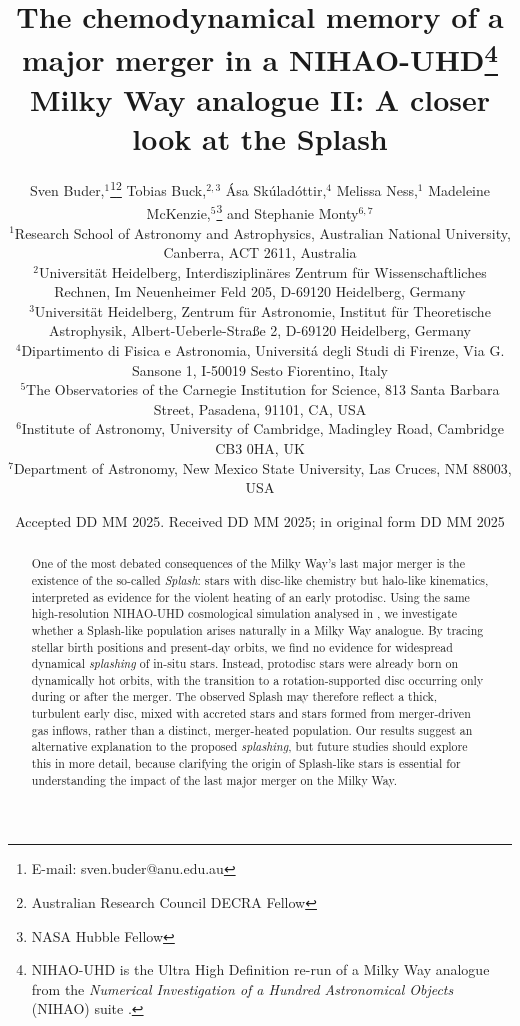 \documentclass[fleqn,usenatbib]{mnras}
\title[A closer look at the Splash]{The chemodynamical memory of a major merger in a NIHAO-UHD\thanks{NIHAO-UHD is the Ultra High Definition re-run of a Milky Way analogue from the \textit{Numerical Investigation of a Hundred Astronomical Objects} (NIHAO) suite \citep{Wang2015}.} Milky Way analogue II: A closer look at the Splash}
\author[S. Buder et al.]{Sven Buder,$^{1}$\thanks{E-mail: sven.buder@anu.edu.au}\thanks{Australian Research Council DECRA Fellow}\orcidlink{0000-0002-4031-8553}
Tobias Buck,$^{2,3}$\orcidlink{0000-0003-2027-399X}
Ása Skúladóttir,$^{4}$\orcidlink{0000-0001-9155-9018}
Melissa Ness,$^{1}$\orcidlink{0000-0001-5082-6693}
Madeleine McKenzie,$^{5}$\thanks{NASA Hubble Fellow}\orcidlink{0000-0002-1715-1257}
and\newauthor
Stephanie Monty$^{6, 7}$\orcidlink{0000-0002-9225-5822}
\\
$^{1}$Research School of Astronomy and Astrophysics, Australian National University, Canberra, ACT 2611, Australia\\
$^{2}$Universit{\"a}t Heidelberg, Interdisziplin{\"a}res Zentrum f{\"u}r Wissenschaftliches Rechnen, Im Neuenheimer Feld 205, D-69120 Heidelberg, Germany\\
$^{3}$Universit{\"a}t Heidelberg, Zentrum f{\"u}r Astronomie, Institut f{\"u}r Theoretische Astrophysik, Albert-Ueberle-Straße 2, D-69120 Heidelberg, Germany\\
$^{4}$Dipartimento di Fisica e Astronomia, Universitá degli Studi di Firenze, Via G. Sansone 1, I-50019 Sesto Fiorentino, Italy\\
$^{5}$The Observatories of the Carnegie Institution for Science, 813 Santa Barbara Street, Pasadena, 91101, CA, USA\\
$^{6}$Institute of Astronomy, University of Cambridge, Madingley Road, Cambridge CB3 0HA, UK\\
$^{7}$Department of Astronomy, New Mexico State University, Las Cruces, NM 88003, USA
}
\date{Accepted DD MM 2025. Received DD MM 2025; in original form DD MM 2025}
\begin{document}
\label{firstpage}
\pagerange{\pageref{firstpage}--\pageref{lastpage}}
\maketitle

\begin{abstract} %
One of the most debated consequences of the Milky Way’s last major merger is the existence of the so-called \textit{Splash}: stars with disc-like chemistry but halo-like kinematics, interpreted as evidence for the violent heating of an early protodisc. Using the same high-resolution NIHAO-UHD cosmological simulation analysed in , we investigate whether a Splash-like population arises naturally in a Milky Way analogue. By tracing stellar birth positions and present-day orbits, we find no evidence for widespread dynamical \textit{splashing} of in-situ stars. Instead, protodisc stars were already born on dynamically hot orbits, with the transition to a rotation-supported disc occurring only during or after the merger. The observed Splash may therefore reflect a thick, turbulent early disc, mixed with accreted stars and stars formed from merger-driven gas inflows, rather than a distinct, merger-heated population. Our results suggest an alternative explanation to the proposed \textit{splashing}, but future studies should explore this in more detail, because clarifying the origin of Splash-like stars is essential for understanding the impact of the last major merger on the Milky Way.

\end{abstract}
\end{document}
